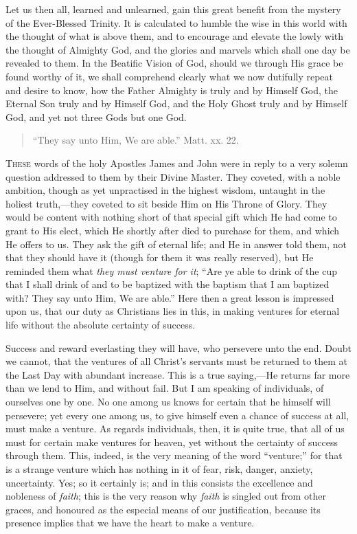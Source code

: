 Let us then all, learned and unlearned, gain this great benefit
from the mystery of the Ever-Blessed Trinity. It is calculated to
humble the wise in this world with the thought of what is above them,
and to encourage and elevate the lowly with the thought of Almighty
God, and the glories and marvels which shall one day be revealed to
them. In the Beatific Vision of God, should we through His grace be
found worthy of it, we shall comprehend clearly what we now dutifully
repeat and desire to know, how the Father Almighty is truly and by
Himself God, the Eternal Son truly and by Himself God, and the Holy
Ghost truly and by Himself God, and yet not three Gods but one God.


\begin{quote}

``They say unto Him, We are able.'' Matt. xx. 22.

\end{quote}

T\textsc{hese} words of the holy Apostles James and John were in reply to a
very solemn question addressed to them by their Divine Master. They
coveted, with a noble ambition, though as yet unpractised in the
highest wisdom, untaught in the holiest truth,—they coveted to sit
beside Him on His Throne of Glory. They would be content with nothing
short of that special gift which He had come to grant to His elect,
which He shortly after died to purchase for them, and which He offers
to us. They ask the gift of eternal life; and He in answer told them,
not that they should have it (though for them it was really reserved),
but He reminded them what \emph{they must venture for it}; ``Are
ye able to drink of the cup that I shall drink of and to be baptized
with the baptism that I am baptized with? They say unto Him, We are
able.'' Here then a great lesson is impressed upon us, that our
duty as Christians lies in this, in making ventures for eternal life
without the absolute certainty of success.

Success and reward everlasting they will have, who persevere unto
the end. Doubt we cannot, that the ventures of all Christ's servants
must be returned to them at the Last Day with abundant increase. This
is a true saying,—He returns far more than we lend to Him, and
without fail. But I am speaking of individuals, of ourselves one by
one. No one among us knows for certain that he himself will persevere;
yet every one among us, to give himself even a chance of success at
all, must make a venture. As regards individuals, then, it is quite
true, that all of us must for certain make ventures for heaven, yet
without the certainty of success through them. This, indeed, is the
very meaning of the word ``venture;'' for that is a strange
venture which has nothing in it of fear, risk, danger, anxiety,
uncertainty. Yes; so it certainly is; and in this consists the
excellence and nobleness of \emph{faith}; this is the very reason why \emph{faith}
is singled out from other graces, and honoured as the especial means
of our justification, because its presence implies that we have the
heart to make a venture.

